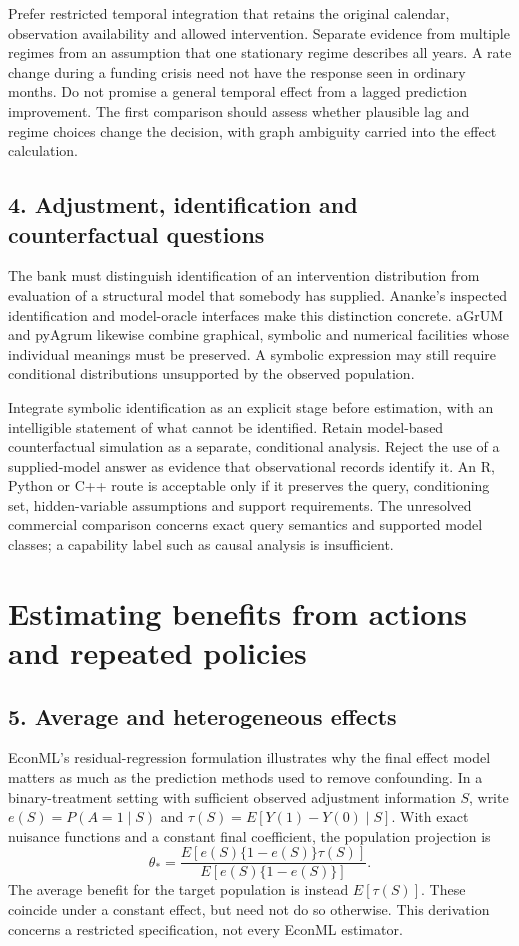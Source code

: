 Prefer restricted temporal integration that retains the original calendar,
observation availability and allowed intervention. Separate evidence from
multiple regimes from an assumption that one stationary regime describes all
years. A rate change during a funding crisis need not have the response seen
in ordinary months. Do not promise a general temporal effect from a lagged
prediction improvement. The first comparison should assess whether plausible
lag and regime choices change the decision, with graph ambiguity carried into
the effect calculation.

\subsection{4. Adjustment, identification and counterfactual questions}
The bank must distinguish identification of an intervention distribution from
evaluation of a structural model that somebody has supplied. Ananke's inspected
identification and model-oracle interfaces make this distinction concrete.
aGrUM and pyAgrum likewise combine graphical, symbolic and numerical facilities
whose individual meanings must be preserved. A symbolic expression may still
require conditional distributions unsupported by the observed population.
\citep{exec24_ananke_source,exec19_cxx_identification_source,exec24_agrum_source}

Integrate symbolic identification as an explicit stage before estimation, with
an intelligible statement of what cannot be identified. Retain model-based
counterfactual simulation as a separate, conditional analysis. Reject the use
of a supplied-model answer as evidence that observational records identify it.
An R, Python or C++ route is acceptable only if it preserves the query,
conditioning set, hidden-variable assumptions and support requirements. The
unresolved commercial comparison concerns exact query semantics and supported
model classes; a capability label such as causal analysis is insufficient.

\section{Estimating benefits from actions and repeated policies}

\subsection{5. Average and heterogeneous effects}
EconML's residual-regression formulation illustrates why the final effect model
matters as much as the prediction methods used to remove confounding. In a
binary-treatment setting with sufficient observed adjustment information $S$,
write $e(S)=P(A=1\mid S)$ and $\tau(S)=E[Y(1)-Y(0)\mid S]$. With exact nuisance
functions and a constant final coefficient, the population projection is
\[
 \theta_* = \frac{E[e(S)\{1-e(S)\}\tau(S)]}
                   {E[e(S)\{1-e(S)\}]}.
\]
The average benefit for the target population is instead $E[\tau(S)]$.
These coincide under a constant effect, but need not do so otherwise. This
derivation concerns a restricted specification, not every EconML estimator.
\citep{exec19_econml_source}

